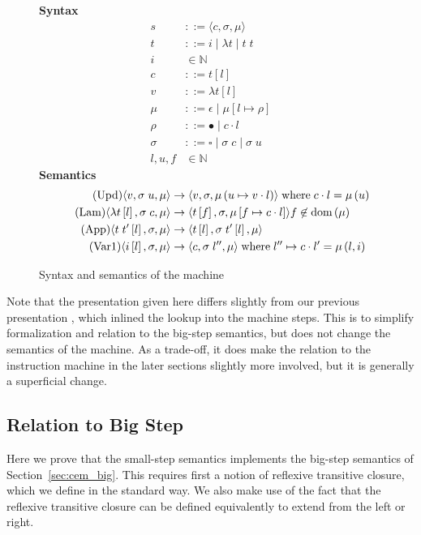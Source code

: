 \begin{figure}
\textbf{Syntax}
\begin{align*}
\tag{State} s &::= \langle c, \sigma, \mu \rangle \\
\tag{Term} t &::= i \; | \; \lambda t \; | \; t \; t  \\
\tag{Variable} i &\in \mathbb{N}  \\
\tag{Closure} c &::= t \left[l\right] \\
\tag{Value} v &::= \lambda t\left[l\right] \\
\tag{Heap} \mu &::= \epsilon \; | \; \mu \left[ l \mapsto \rho \right] \\
\tag{Environment} \rho &::= \bullet \; | \; c \cdot l \\
\tag{Stack} \sigma &::= \square \; | \; \sigma \; c \;  | \; \sigma \; u \\
\tag{Location} l,u,f &\in \mathbb{N}
\end{align*}
\textbf{Semantics}
\begin{align*}
\tag{Upd}
\langle v,  \sigma \; u , \mu \rangle 
  &\rightarrow
\langle v, \sigma, \mu\left(u \mapsto v \cdot l\right) \rangle  
\; \textnormal{where} \; c \cdot l = \mu\left(u\right) \\
\tag{Lam}
\langle \lambda t\left[l\right], \sigma \; c, \mu \rangle 
  &\rightarrow
\langle t\left[f\right], \sigma, \mu\left[f \mapsto c \cdot l\right]\rangle f
\not \in \textnormal{dom}\left(\mu\right)  \\
\tag{App}
\langle t \; t'\left[l\right], \sigma, \mu \rangle
  &\rightarrow
\langle t\left[l\right], \sigma \; t'\left[l\right], \mu \rangle \\
\tag{Var1}
\langle i\left[l\right], \sigma, \mu \rangle
  &\rightarrow
\langle c, \sigma \; l'', \mu \rangle
\; \textnormal{where} \; l'' \mapsto c \cdot l' = \mu\left(l, i\right)
\end{align*}
\caption{Syntax and semantics of the \ce machine}
\label{fig:cesm}
\end{figure}

Note that the presentation given here differs slightly from our previous
presentation \cite{cem}, which inlined the lookup into the machine steps. This
is to simplify formalization and relation to the big-step semantics, but does not
change the semantics of the machine. As a trade-off, it does make the relation to
the instruction machine in the later sections slightly more involved, but
it is generally a superficial change.

\subsection{Relation to Big Step}
Here we prove that the small-step semantics implements the big-step semantics of
Section~\ref{sec:cem_big}. This requires first a notion of reflexive transitive closure,
which we define in the standard way. We also make use of the fact that the
reflexive transitive closure can be defined equivalently to extend from the left
or right. 

